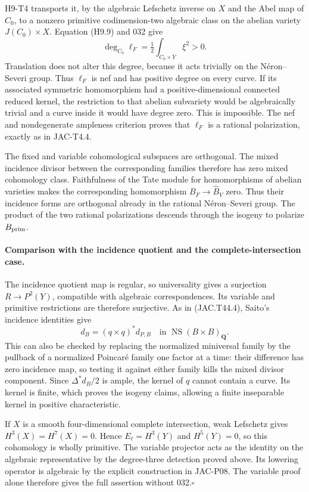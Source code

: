 H9-T4 transports it, by the algebraic Lefschetz inverse on $X$ and the
Abel map of $C_0$, to a nonzero primitive codimension-two algebraic
class on the abelian variety $J(C_0)\times X$. Equation (H9.9) and
032 give
\[
 \deg_{C_0}\ell_F
       =\tfrac12\int_{C_0\times Y}\xi^2>0.
\]
Translation does not alter this degree, because it acts trivially on
the N\'eron--Severi group. Thus $\ell_F$ is nef and has positive degree
on every curve. If its associated symmetric homomorphism had a
positive-dimensional connected reduced kernel, the restriction to
that abelian subvariety would be algebraically trivial and a curve
inside it would have degree zero. This is impossible. The nef and
nondegenerate ampleness criterion proves that $\ell_F$ is a rational
polarization, exactly as in JAC-T4.4.

The fixed and variable cohomological subspaces are orthogonal. The
mixed incidence divisor between the corresponding families therefore
has zero mixed cohomology class. Faithfulness of the Tate module for
homomorphisms of abelian varieties makes the corresponding homomorphism
$B_F\to\widehat B_V$ zero. Thus their incidence forms are orthogonal
already in the rational N\'eron--Severi group. The product of the two
rational polarizations descends through the isogeny to polarize
$B_{\rm prim}$.

\paragraph{Comparison with the incidence quotient and the complete-intersection case.}
The incidence quotient map is regular, so universality gives a
surjection $R\to P^2(Y)$, compatible with algebraic correspondences.
Its variable and primitive restrictions are therefore surjective.
As in (JAC.T44.4), Saito's incidence identities give
\[
 d_B=(q\times q)^*d_{P,B}
       \quad\text{in }\operatorname{NS}(B\times B)_{\mathbf Q}.
\]
This can also be checked by replacing the normalized miniversal family
by the pullback of a normalized Poincar\'e family one factor at a time:
their difference has zero incidence map, so testing it against either
family kills the mixed divisor component. Since $\Delta^*d_B/2$ is
ample, the kernel of $q$ cannot contain a curve. Its kernel is finite,
which proves the isogeny claims, allowing a finite inseparable kernel
in positive characteristic.

If $X$ is a smooth four-dimensional complete intersection, weak
Lefschetz gives $H^3(X)=H^7(X)=0$. Hence $E_\ell=H^3(Y)$ and
$H^5(Y)=0$, so this cohomology is wholly primitive. The variable
projector acts as the identity on the algebraic representative by the
degree-three detection proved above. Its lowering operator is algebraic
by the explicit construction in JAC-P08. The variable proof alone
therefore gives the full assertion without 032.\hfill$\square$

